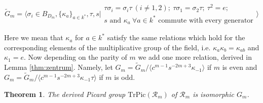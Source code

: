 \documentclass[12pt]{amsart}
\theoremstyle{plain}
\newtheorem{theorem}{Theorem}%
\theoremstyle{remark}
\theoremstyle{definition}
\newcommand{\TrPic}{{\mathrm{TrPic}}}
\begin{document}
$$ \widetilde{G}_{m} = \bigg\langle \sigma_i \in B_{D_{m}},\{\kappa_a\}_{a \in k^*}, \tau, s \bigg| \begin{array}{c}
\tau \sigma_i = \sigma_i \tau \ (i\neq 1,2); \ \tau \sigma_1 = \sigma_2 \tau; \  \tau^2 = e; \  \\  s \text{ and }  \kappa_a \ \forall a \in k^* \text{ commute with every generator}
\end{array} \bigg\rangle $$

\noindent Here we mean that $\kappa_a$ for $a \in k^*$ satisfy the same relations which hold for the corresponding elements of the multiplicative group of the field, i.e. $\kappa_a\kappa_b = \kappa_{ab}$ and $\kappa_1 = e$. Now depending on the parity of $m$ we add one more relation, derived in Lemma \ref{thm:zentrum}. Namely, let $G_m = \widetilde{G}_m/ \langle c^{m-1}s^{-2m+3} \kappa_{-1} \rangle$ if $m$ is even and $G_m = \widetilde{G}_m/ \langle c^{m-1}s^{-2m+3} \kappa_{-1}\tau \rangle$ if $m$ is odd. 


\begin{theorem}\label{thm:main} The derived Picard group $\TrPic(\mathcal{R}_m)$ of $\mathcal{R}_m$ is isomorphic $G_m$.  \end{theorem}
\end{document}
